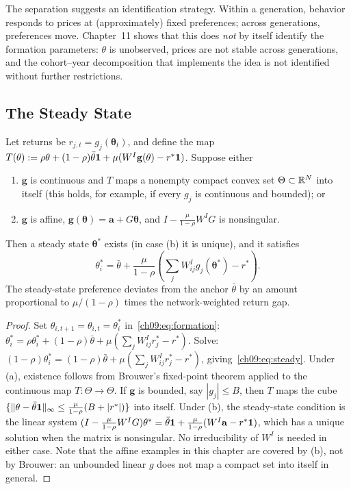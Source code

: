 \documentclass[../structural_economics_book.tex]{subfiles}
\begin{document}
The separation suggests an identification strategy. Within a generation, behavior responds to prices at (approximately) fixed preferences; across generations, preferences move. Chapter~11 shows that this does \textit{not} by itself identify the formation parameters: $\theta$ is unobserved, prices are not stable across generations, and the cohort--year decomposition that implements the idea is not identified without further restrictions.


\subsection{The Steady State}

\begin{proposition}\label{ch09:prop:steady}
Let returns be $r_{j,t} = g_j(\boldsymbol{\theta}_t)$, and define the map $T(\theta) := \rho\theta + (1-\rho)\bar{\theta}\mathbf{1} + \mu(W^I\mathbf{g}(\theta) - r^*\mathbf{1})$. Suppose either
\begin{enumerate}
\item[(a)] $\mathbf{g}$ is continuous and $T$ maps a nonempty compact convex set $\Theta \subset \mathbb{R}^N$ into itself (this holds, for example, if every $g_j$ is continuous and bounded); or
\item[(b)] $\mathbf{g}$ is affine, $\mathbf{g}(\boldsymbol{\theta}) = \mathbf{a} + G\boldsymbol{\theta}$, and $I - \frac{\mu}{1-\rho}W^I G$ is nonsingular.
\end{enumerate}
Then a steady state $\boldsymbol{\theta}^*$ exists (in case (b) it is unique), and it satisfies
\begin{equation}\label{ch09:eq:steady}
\theta_i^* = \bar{\theta} + \frac{\mu}{1-\rho}\left(\sum_j W^I_{ij} g_j(\boldsymbol{\theta}^*) - r^*\right).
\end{equation}
The steady-state preference deviates from the anchor $\bar{\theta}$ by an amount proportional to $\mu/(1-\rho)$ times the network-weighted return gap.
\end{proposition}

\begin{proof}
Set $\theta_{i,t+1} = \theta_{i,t} = \theta_i^*$ in~\eqref{ch09:eq:formation}:
$\theta_i^* = \rho\theta_i^* + (1-\rho)\bar{\theta} + \mu(\sum_j W^I_{ij} r_j^* - r^*)$.
Solve: $(1-\rho)\theta_i^* = (1-\rho)\bar{\theta} + \mu(\sum_j W^I_{ij} r_j^* - r^*)$, giving~\eqref{ch09:eq:steady}. Under (a), existence follows from Brouwer's fixed-point theorem applied to the continuous map $T: \Theta \to \Theta$. If $\mathbf{g}$ is bounded, say $|g_j| \le B$, then $T$ maps the cube $\{\|\theta - \bar{\theta}\mathbf{1}\|_\infty \le \frac{\mu}{1-\rho}(B + |r^*|)\}$ into itself. Under (b), the steady-state condition is the linear system $(I - \frac{\mu}{1-\rho}W^I G)\theta^* = \bar{\theta}\mathbf{1} + \frac{\mu}{1-\rho}(W^I\mathbf{a} - r^*\mathbf{1})$, which has a unique solution when the matrix is nonsingular. No irreducibility of $W^I$ is needed in either case. Note that the affine examples in this chapter are covered by (b), not by Brouwer: an unbounded linear $g$ does not map a compact set into itself in general.
\end{proof}
\end{document}
